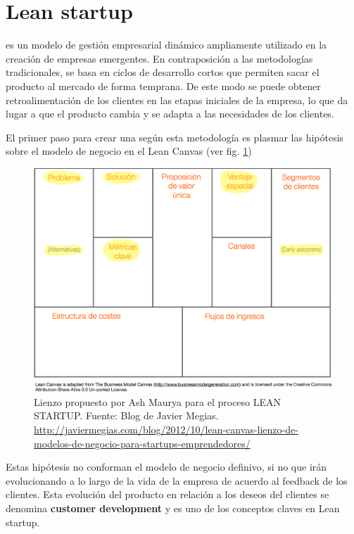 \section{Lean startup}

 es un modelo de gestión empresarial dinámico ampliamente utilizado en la creación de empresas emergentes. En contraposición a las metodologías tradicionales,   se basa en ciclos de desarrollo cortos que permiten sacar el producto al mercado de forma temprana. De este modo se puede obtener retroalimentación de los clientes en las etapas iniciales de la empresa, lo que da lugar a que el producto cambia y se adapta a las necesidades de los clientes.

El primer paso para crear una  según esta metodología es plasmar las hipótesis sobre el modelo de negocio en el Lean Canvas (ver fig. \ref{leanCanvas})

\begin{figure}[H]
\begin{center}
\includegraphics[scale=0.25]{imagenes/lienzo_lean_canvas.png}
\caption{Lienzo propuesto por Ash Maurya para el proceso LEAN STARTUP. Fuente: Blog de Javier Megias. \url{http://javiermegias.com/blog/2012/10/lean-canvas-lienzo-de-modelos-de-negocio-para-startups-emprendedores/} }
\label{leanCanvas}
\end{center}
\end{figure}

Estas hipótesis no conforman el modelo de negocio definivo, si no que irán evolucionando a lo largo de la vida de la empresa de acuerdo al feedback de los clientes. Esta evolución del producto en relación a los deseos del clientes se denomina \textbf{customer development} y es uno de los conceptos claves en Lean startup.

